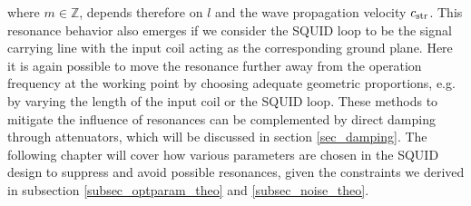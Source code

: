 
where $m\in\mathbb{Z}$, depends therefore on $l$ and the wave propagation velocity $c_{\rm str}$. This resonance behavior also emerges if we consider the SQUID loop to be the signal carrying line with the input coil acting as the corresponding ground plane.  Here it is again possible to move the resonance further away from the operation frequency at the working point by choosing adequate geometric proportions, e.g. by varying the length of the input coil or the SQUID loop. These methods to mitigate the influence of resonances can be complemented by direct damping through attenuators, which will be discussed in section \ref{sec_damping}. The following chapter will cover how various parameters are chosen in the SQUID design to suppress and avoid possible resonances, given the constraints we derived in subsection \ref{subsec_optparam_theo} and \ref{subsec_noise_theo}.